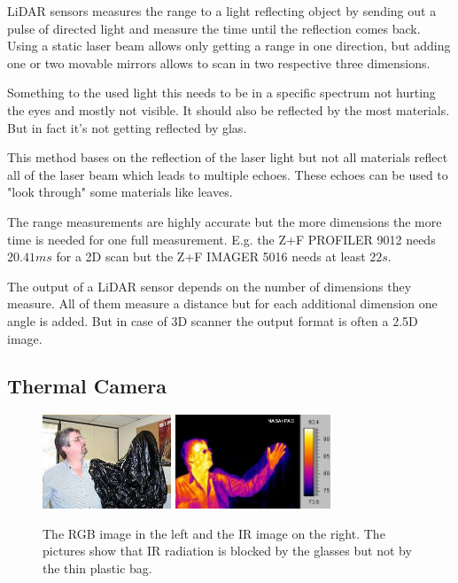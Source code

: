 \ac{LiDAR} sensors measures the range to a light reflecting object by sending out a pulse of directed light and measure the time until the reflection comes back.
Using a static laser beam allows only getting a range in one direction, but adding one or two movable mirrors allows to scan in two respective three dimensions. 

Something to the used light this needs to be in a specific spectrum not hurting the eyes and mostly not visible.
It should also be reflected by the most materials.
But in fact it's not getting reflected by glas.


This method bases on the reflection of the laser light but not all materials reflect all of the laser beam which leads to multiple echoes.
These echoes can be used to "look through" some materials like leaves. 

The range measurements are highly accurate but the more dimensions the more time is needed for one full measurement.
E.g. the Z+F PROFILER\circledR{} 9012 needs $20.41\si{ms}$ for a 2D scan but the Z+F IMAGER\circledR{} 5016 needs at least $22\si{s}$.

The output of a \ac{LiDAR} sensor depends on the number of dimensions they measure.
All of them measure a distance but for each additional dimension one angle is added.
But in case of 3D scanner the output format is often a 2.5D image.

\subsection{Thermal Camera}\label{ssec:thermalCamera}

\begin{figure}
	\centering
	\includegraphics[height=2.8cm]{img/fundamentals/Human-Visible.jpg}
	\includegraphics[height=2.8cm]{img/fundamentals/Human-Infrared.jpg}

	\caption{The RGB image in the left and the IR image on the right. The pictures show that IR radiation is blocked by the glasses but not by the thin plastic bag.}
	\label{fig:humanIRVIS}
\end{figure}

